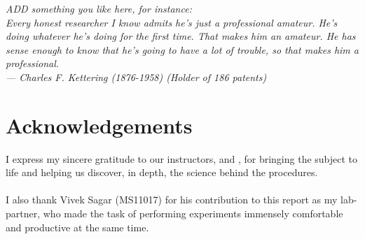 
\begin{flushright}{\slshape    
ADD something you like here, for instance: \\
Every honest researcher I know admits he's just a professional amateur.
He's doing whatever he's doing for the first time. That makes him an amateur.
He has sense enough to know that he's going to have a lot of trouble,
so that makes him a professional.\\ \medskip
--- Charles F. Kettering (1876-1958) (Holder of 186 patents)}
\end{flushright}



\bigskip

\begingroup
\let\clearpage\relax
\let\cleardoublepage\relax
\let\cleardoublepage\relax
\chapter*{Acknowledgements}
I express my sincere gratitude to our instructors, \myProf and \myOtherProf, for bringing the subject to life and helping us discover, in depth, the science behind the procedures.\\
 \\
I also thank Vivek Sagar (MS11017) for his contribution to this report as my lab-partner, who made the task of performing experiments immensely comfortable and productive at the same time.\\
\bigskip


\endgroup



